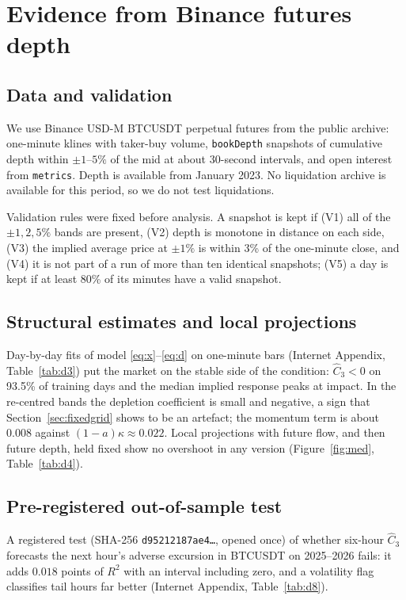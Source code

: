 \documentclass[12pt]{article}
\theoremstyle{definition}
\theoremstyle{remark}
\begin{document}
\section{Evidence from Binance futures depth}\label{sec:depth}

\subsection{Data and validation}
We use Binance USD-M BTCUSDT perpetual futures from the public archive: one-minute klines with taker-buy volume, \texttt{bookDepth} snapshots of cumulative depth within $\pm1$--$5\%$ of the mid at about 30-second intervals, and open interest from \texttt{metrics}. Depth is available from January 2023. No liquidation archive is available for this period, so we do not test liquidations.

Validation rules were fixed before analysis. A snapshot is kept if (V1) all of the $\pm1,2,5\%$ bands are present, (V2) depth is monotone in distance on each side, (V3) the implied average price at $\pm1\%$ is within 3\% of the one-minute close, and (V4) it is not part of a run of more than ten identical snapshots; (V5) a day is kept if at least 80\% of its minutes have a valid snapshot.



\subsection{Structural estimates and local projections}
Day-by-day fits of model \eqref{eq:x}--\eqref{eq:d} on one-minute bars (Internet Appendix, Table~\ref{tab:d3}) put the market on the stable side of the condition: $\hat C_3<0$ on 93.5\% of training days and the median implied response peaks at impact. In the re-centred bands the depletion coefficient is small and negative, a sign that Section~\ref{sec:fixedgrid} shows to be an artefact; the momentum term is about $0.008$ against $(1-a)\kappa\approx0.022$. Local projections with future flow, and then future depth, held fixed show no overshoot in any version (Figure~\ref{fig:med}, Table~\ref{tab:d4}).

\subsection{Pre-registered out-of-sample test}
A registered test (SHA-256 \texttt{d95212187ae4\ldots}, opened once) of whether six-hour $\hat C_3$ forecasts the next hour's adverse excursion in BTCUSDT on 2025--2026 fails: it adds $0.018$ points of $R^2$ with an interval including zero, and a volatility flag classifies tail hours far better (Internet Appendix, Table~\ref{tab:d8}).
\end{document}

